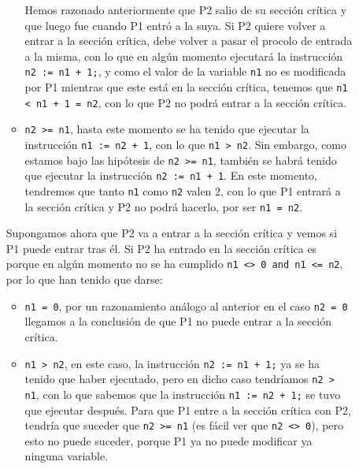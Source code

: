 \begin{ejercicio}
\begin{enumerate}[label=(\alph*)]
\begin{description}
\begin{itemize}
                            Hemos razonado anteriormente que P2 salio de su sección crítica y que luego fue cuando P1 entró a la suya. Si P2 quiere volver a entrar a la sección crítica, debe volver a pasar el procolo de entrada a la misma, con lo que en algún momento ejecutará la instrucción \verb|n2 := n1 + 1;|, y como el valor de la variable \verb|n1| no es modificada por P1 mientras que este está en la sección crítica, tenemos que \verb|n1 < n1 + 1 = n2|, con lo que P2 no podrá entrar a la sección crítica.
                        \item \verb|n2 >= n1|, hasta este momento se ha tenido que ejecutar la instrucción \verb|n1 := n2 + 1|, con lo que \verb|n1 > n2|. Sin embargo, como estamos bajo las hipótesis de \verb|n2 >= n1|, también se habrá tenido que ejecutar la instrucción \verb|n2 := n1 + 1|. En este momento, tendremos que tanto \verb|n1| como \verb|n2| valen 2, con lo que P1 entrará a la sección crítica y P2 no podrá hacerlo, por ser \verb|n1 = n2|.
                    \end{itemize}
                    Supongamos ahora que P2 va a entrar a la sección crítica y vemos si P1 puede entrar tras él. Si P2 ha entrado en la sección crítica es porque en algún momento no se ha cumplido \verb|n1 <> 0 and n1 <= n2|, por lo que han tenido que darse:
                    \begin{itemize}
                        \item \verb|n1 = 0|, por un razonamiento análogo al anterior en el caso \verb|n2 = 0| llegamos a la conclusión de que P1 no puede entrar a la sección crítica.
                        \item \verb|n1 > n2|, en este caso, la instrucción \verb|n2 := n1 + 1;| ya se ha tenido que haber ejecutado, pero en dicho caso tendríamos \verb|n2 > n1|, con lo que sabemos que la instrucción \verb|n1 := n2 + 1;| se tuvo que ejecutar después. Para que P1 entre a la sección crítica con P2, tendría que suceder que \verb|n2 >= n1| (es fácil ver que \verb|n2 <> 0|), pero esto no puede suceder, porque P1 ya no puede modificar ya ninguna variable.


\end{itemize}
\end{description}
\end{enumerate}
\end{ejercicio}
